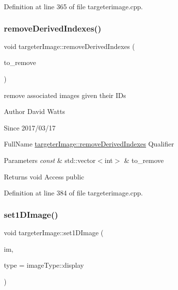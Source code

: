 Definition at line 365 of file targeterimage.\+cpp.

\mbox{\label{classtargeter_image_a578e6fabf498c693b7183437ea4dd9e2}} 
\subsubsection{\texorpdfstring{remove\+Derived\+Indexes()}{removeDerivedIndexes()}}
{\footnotesize\ttfamily void targeter\+Image\+::remove\+Derived\+Indexes (\begin{DoxyParamCaption}\item[{const std\+::vector$<$ int $>$ \&}]{to\+\_\+remove }\end{DoxyParamCaption})}

remove associated images given their ID\textquotesingle{}s

\begin{DoxyAuthor}{Author}
David Watts 
\end{DoxyAuthor}
\begin{DoxySince}{Since}
2017/03/17
\end{DoxySince}
Full\+Name \hyperlink{classtargeter_image_a578e6fabf498c693b7183437ea4dd9e2}{targeter\+Image\+::remove\+Derived\+Indexes} Qualifier 
\begin{DoxyParams}{Parameters}
{\em const} & std\+::vector$<$int$>$ \& to\+\_\+remove \\
\hline
\end{DoxyParams}
\begin{DoxyReturn}{Returns}
void Access public 
\end{DoxyReturn}


Definition at line 384 of file targeterimage.\+cpp.

\mbox{\label{classtargeter_image_abcdf64a3dcbb3fc4c9d4a79e9fd658fc}} 
\subsubsection{\texorpdfstring{set1\+D\+Image()}{set1DImage()}}
{\footnotesize\ttfamily void targeter\+Image\+::set1\+D\+Image (\begin{DoxyParamCaption}\item[{int $\ast$}]{im,  }\item[{image\+Type\+::image\+Type}]{type = {\ttfamily imageType\+:\+:display} }\end{DoxyParamCaption})}


